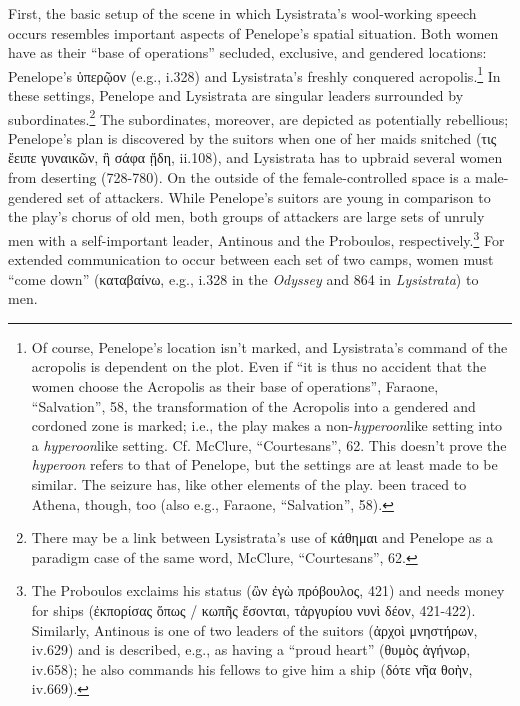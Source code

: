 \documentclass[12pt]{article}
\begin{document}
First, the basic setup of the scene in which Lysistrata's wool-working speech occurs resembles important aspects of Penelope's spatial situation. Both women have as their ``base of operations'' secluded, exclusive, and gendered locations: Penelope's ὑπερῷον (e.g., i.328) and Lysistrata's freshly conquered acropolis.\footnote{Of course, Penelope's location isn't marked, and Lysistrata's command of the acropolis is dependent on the plot. Even if ``it is thus no accident that the women choose the Acropolis as their base of operations'', Faraone, ``Salvation'', 58, the transformation of the Acropolis into a gendered and cordoned zone is marked; i.e., the play makes a non-\textit{hyperoon}\-like setting into a \textit{hyperoon}\-like setting. Cf. McClure, ``Courtesans'', 62. This doesn't prove the \textit{hyperoon} refers to that of Penelope, but the settings are at least made to be similar. The seizure has, like other elements of the play. been traced to Athena, though, too (also e.g., Faraone, ``Salvation'', 58).} In these settings, Penelope and Lysistrata are singular leaders surrounded by subordinates.\footnote{There may be a link between Lysistrata's use of κάθημαι and Penelope as a paradigm case of the same word, McClure, ``Courtesans'', 62.} The subordinates, moreover, are depicted as potentially rebellious; Penelope's plan is discovered by the suitors when one of her maids snitched (τις ἔειπε γυναικῶν, ἣ σάφα ᾔδη, ii.108), and Lysistrata has to upbraid several women from deserting (728-780). On the outside of the female-controlled space is a male-gendered set of attackers. While Penelope's suitors are young in comparison to the play's chorus of old men, both groups of attackers are large sets of unruly men with a self-important leader, Antinous and the Proboulos, respectively.\footnote{The Proboulos exclaims his status (ὢν ἐγὼ πρόβουλος, 421) and needs money for ships (ἐκπορίσας ὅπως / κωπῆς ἔσονται, τἀργυρίου νυνὶ δέον, 421-422). Similarly, Antinous is one of two leaders of the suitors (ἀρχοὶ μνηστήρων, iv.629) and is described, e.g., as having a ``proud heart'' (θυμὸς ἀγήνωρ, iv.658); he also commands his fellows to give him a ship (δότε νῆα θοὴν, iv.669).} For extended communication to occur between each set of two camps, women must ``come down'' (καταβαίνω, e.g., i.328 in the \textit{Odyssey} and 864 in \textit{Lysistrata}) to men.
\end{document}
